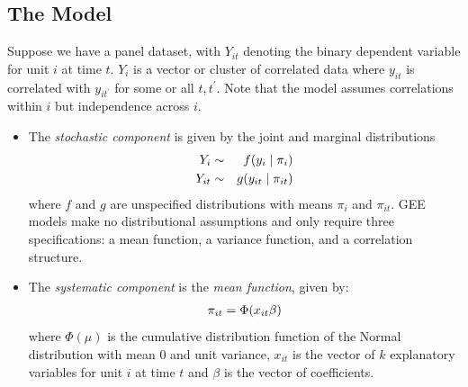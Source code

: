 \documentclass[letterpaper,10pt,english]{sphinxmanual}
\begin{document}
\subsection{The Model}
\label{vignette:id137}
Suppose we have a panel dataset, with \(Y_{it}\) denoting the binary
dependent variable for unit \(i\) at time \(t\). \(Y_{i}\)
is a vector or cluster of correlated data where \(y_{it}\) is
correlated with \(y_{it^\prime}\) for some or all
\(t, t^\prime\). Note that the model assumes correlations within
\(i\) but independence across \(i\).
\begin{itemize}
\item {} 
The \emph{stochastic component} is given by the joint and marginal
distributions
\begin{gather}
\begin{split}\begin{aligned}
Y_{i} &\sim& f(y_{i} \mid \pi_{i})\\
Y_{it} &\sim& g(y_{it} \mid \pi_{it})\end{aligned}\end{split}\notag
\end{gather}
where \(f\) and \(g\) are unspecified distributions with
means \(\pi_{i}\) and \(\pi_{it}\). GEE models make no
distributional assumptions and only require three specifications: a
mean function, a variance function, and a correlation structure.

\item {} 
The \emph{systematic component} is the \emph{mean function}, given by:
\begin{gather}
\begin{split}\pi_{it} = \Phi(x_{it} \beta)\end{split}\notag
\end{gather}
where \(\Phi(\mu)\) is the cumulative distribution function of
the Normal distribution with mean 0 and unit variance, \(x_{it}\)
is the vector of \(k\) explanatory variables for unit \(i\)
at time \(t\) and \(\beta\) is the vector of coefficients.


\end{itemize}
\end{document}
